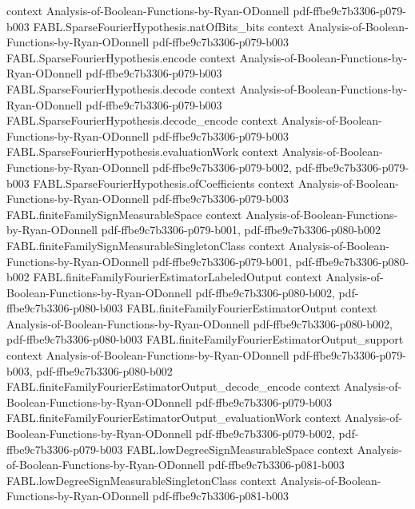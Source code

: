 \begin{theorem}
  {context}
  {Analysis-of-Boolean-Functions-by-Ryan-ODonnell}
  {pdf-ffbe9c7b3306-p079-b003}
\proofstep
  {FABL.SparseFourierHypothesis.natOfBits_bits}
  {context}
  {Analysis-of-Boolean-Functions-by-Ryan-ODonnell}
  {pdf-ffbe9c7b3306-p079-b003}
\proofstep
  {FABL.SparseFourierHypothesis.encode}
  {context}
  {Analysis-of-Boolean-Functions-by-Ryan-ODonnell}
  {pdf-ffbe9c7b3306-p079-b003}
\proofstep
  {FABL.SparseFourierHypothesis.decode}
  {context}
  {Analysis-of-Boolean-Functions-by-Ryan-ODonnell}
  {pdf-ffbe9c7b3306-p079-b003}
\proofstep
  {FABL.SparseFourierHypothesis.decode_encode}
  {context}
  {Analysis-of-Boolean-Functions-by-Ryan-ODonnell}
  {pdf-ffbe9c7b3306-p079-b003}
\proofstep
  {FABL.SparseFourierHypothesis.evaluationWork}
  {context}
  {Analysis-of-Boolean-Functions-by-Ryan-ODonnell}
  {pdf-ffbe9c7b3306-p079-b002,
    pdf-ffbe9c7b3306-p079-b003}
\proofstep
  {FABL.SparseFourierHypothesis.ofCoefficients}
  {context}
  {Analysis-of-Boolean-Functions-by-Ryan-ODonnell}
  {pdf-ffbe9c7b3306-p079-b003}
\proofstep
  {FABL.finiteFamilySignMeasurableSpace}
  {context}
  {Analysis-of-Boolean-Functions-by-Ryan-ODonnell}
  {pdf-ffbe9c7b3306-p079-b001,
    pdf-ffbe9c7b3306-p080-b002}
\proofstep
  {FABL.finiteFamilySignMeasurableSingletonClass}
  {context}
  {Analysis-of-Boolean-Functions-by-Ryan-ODonnell}
  {pdf-ffbe9c7b3306-p079-b001,
    pdf-ffbe9c7b3306-p080-b002}
\proofstep
  {FABL.finiteFamilyFourierEstimatorLabeledOutput}
  {context}
  {Analysis-of-Boolean-Functions-by-Ryan-ODonnell}
  {pdf-ffbe9c7b3306-p080-b002,
    pdf-ffbe9c7b3306-p080-b003}
\proofstep
  {FABL.finiteFamilyFourierEstimatorOutput}
  {context}
  {Analysis-of-Boolean-Functions-by-Ryan-ODonnell}
  {pdf-ffbe9c7b3306-p080-b002,
    pdf-ffbe9c7b3306-p080-b003}
\proofstep
  {FABL.finiteFamilyFourierEstimatorOutput_support}
  {context}
  {Analysis-of-Boolean-Functions-by-Ryan-ODonnell}
  {pdf-ffbe9c7b3306-p079-b003,
    pdf-ffbe9c7b3306-p080-b002}
\proofstep
  {FABL.finiteFamilyFourierEstimatorOutput_decode_encode}
  {context}
  {Analysis-of-Boolean-Functions-by-Ryan-ODonnell}
  {pdf-ffbe9c7b3306-p079-b003}
\proofstep
  {FABL.finiteFamilyFourierEstimatorOutput_evaluationWork}
  {context}
  {Analysis-of-Boolean-Functions-by-Ryan-ODonnell}
  {pdf-ffbe9c7b3306-p079-b002,
    pdf-ffbe9c7b3306-p079-b003}
\proofstep
  {FABL.lowDegreeSignMeasurableSpace}
  {context}
  {Analysis-of-Boolean-Functions-by-Ryan-ODonnell}
  {pdf-ffbe9c7b3306-p081-b003}
\proofstep
  {FABL.lowDegreeSignMeasurableSingletonClass}
  {context}
  {Analysis-of-Boolean-Functions-by-Ryan-ODonnell}
  {pdf-ffbe9c7b3306-p081-b003}

\end{theorem}
